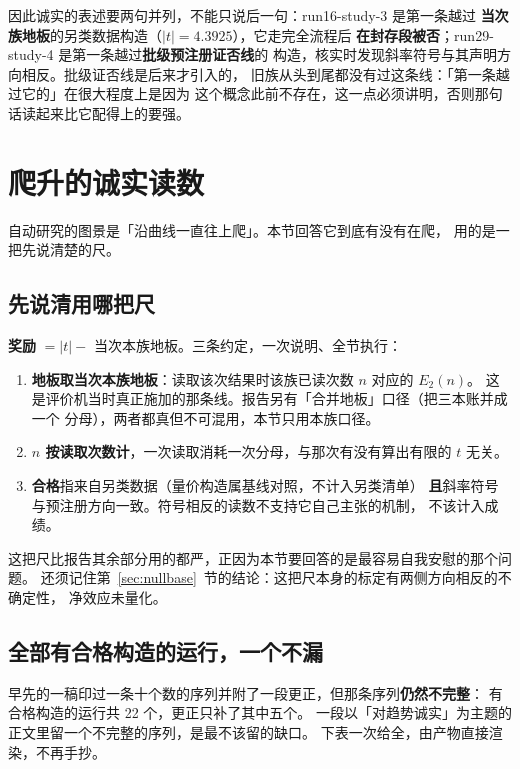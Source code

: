 \documentclass[11pt]{ctexart}
\begin{document}
因此诚实的表述要两句并列，不能只说后一句：run16-study-3 是第一条越过
\textbf{当次族地板}的另类数据构造（$|t|=4.3925$），它走完全流程后
\textbf{在封存段被否}；run29-study-4 是第一条越过\textbf{批级预注册证否线}的
构造，核实时发现斜率符号与其声明方向相反。批级证否线是后来才引入的，
旧族从头到尾都没有过这条线：「第一条越过它的」在很大程度上是因为
这个概念此前不存在，这一点必须讲明，否则那句话读起来比它配得上的要强。

\section{爬升的诚实读数}\label{sec:climb}
自动研究的图景是「沿曲线一直往上爬」。本节回答它到底有没有在爬，
用的是一把先说清楚的尺。

\subsection{先说清用哪把尺}
\textbf{奖励} $=|t|-$ 当次本族地板。三条约定，一次说明、全节执行：

\begin{enumerate}
\item \textbf{地板取当次本族地板}：读取该次结果时该族已读次数 $n$ 对应的 $E_2(n)$。
      这是评价机当时真正施加的那条线。报告另有「合并地板」口径（把三本账并成一个
      分母），两者都真但不可混用，本节只用本族口径。
\item \textbf{$n$ 按读取次数计}，一次读取消耗一次分母，与那次有没有算出有限的 $t$ 无关。
\item \textbf{合格}指来自另类数据（量价构造属基线对照，不计入另类清单）
      \textbf{且}斜率符号与预注册方向一致。符号相反的读数不支持它自己主张的机制，
      不该计入成绩。
\end{enumerate}

这把尺比报告其余部分用的都严，正因为本节要回答的是最容易自我安慰的那个问题。
还须记住第~\ref{sec:nullbase}~节的结论：这把尺本身的标定有两侧方向相反的不确定性，
净效应未量化。

\subsection{全部有合格构造的运行，一个不漏}
早先的一稿印过一条十个数的序列并附了一段更正，但那条序列\textbf{仍然不完整}：
有合格构造的运行共 22 个，更正只补了其中五个。
一段以「对趋势诚实」为主题的正文里留一个不完整的序列，是最不该留的缺口。
下表一次给全，由产物直接渲染，不再手抄。
\end{document}
